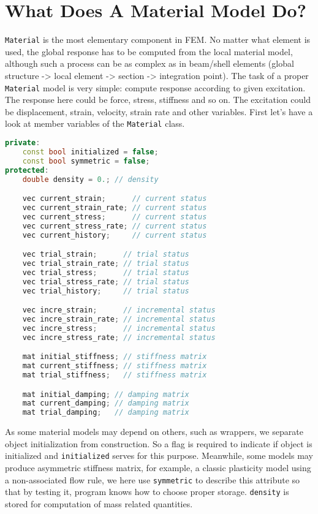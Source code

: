 \documentclass[11pt]{article}
\begin{document}
\section{What Does A Material Model Do?}
\texttt{Material} is the most elementary component in FEM. No matter what element is used, the global response has to be computed from the local material model, although such a process can be as complex as in beam/shell elements (global structure -> local element -> section -> integration point). The task of a proper \texttt{Material} model is very simple: compute response according to given excitation. The response here could be force, stress, stiffness and so on. The excitation could be displacement, strain, velocity, strain rate and other variables. First let's have a look at member variables of the \texttt{Material} class.
\begin{lstlisting}[language=C++]
private:
	const bool initialized = false;
	const bool symmetric = false;
protected:
	double density = 0.; // density

	vec current_strain;      // current status
	vec current_strain_rate; // current status
	vec current_stress;      // current status
	vec current_stress_rate; // current status
	vec current_history;     // current status

	vec trial_strain;      // trial status
	vec trial_strain_rate; // trial status
	vec trial_stress;      // trial status
	vec trial_stress_rate; // trial status
	vec trial_history;     // trial status

	vec incre_strain;      // incremental status
	vec incre_strain_rate; // incremental status
	vec incre_stress;      // incremental status
	vec incre_stress_rate; // incremental status

	mat initial_stiffness; // stiffness matrix
	mat current_stiffness; // stiffness matrix
	mat trial_stiffness;   // stiffness matrix

	mat initial_damping; // damping matrix
	mat current_damping; // damping matrix
	mat trial_damping;   // damping matrix
\end{lstlisting}

As some material models may depend on others, such as wrappers, we separate object initialization from construction. So a flag is required to indicate if object is initialized and \texttt{initialized} serves for this purpose. Meanwhile, some models may produce asymmetric stiffness matrix, for example, a classic plasticity model using a non-associated flow rule, we here use \texttt{symmetric} to describe this attribute so that by testing it, program knows how to choose proper storage. \texttt{density} is stored for computation of mass related quantities.
\end{document}
